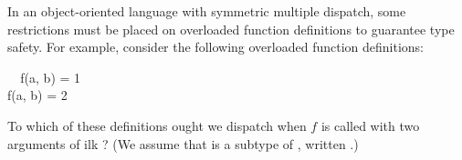 \documentclass[10pt]{sigplanconf}
\newcommand{\TODO}[1]{\textbf{\emph{\textcolor{red}{TODO}}}: \textsf{\footnotesize #1}}
\begin{document}


In an object-oriented language with symmetric multiple dispatch,
some restrictions must be placed on overloaded function definitions
to guarantee type safety.
For example, 
consider the following overloaded function definitions:

\small
\begin{FortressCode}
{\tt ~~}\+f(a\COLON {}, b\COLON {})\COLON {} = 1 \\
  f(a\COLON {}, b\COLON {})\COLON {} = 2\-
\end{FortressCode}
\normalsize
To which of these definitions ought we dispatch 
when $f$ is called with two arguments of ilk ?
(We assume that  is a subtype of , written .)
\end{document}
